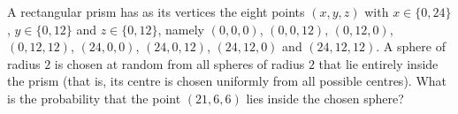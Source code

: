 A rectangular prism has as its vertices the eight points $(x,y,z)$ with $x\in\{0,24\}$, $y\in\{0,12\}$ and $z\in\{0,12\}$, namely $(0,0,0)$, $(0,0,12)$, $(0,12,0)$, $(0,12,12)$, $(24,0,0)$, $(24,0,12)$, $(24,12,0)$ and $(24,12,12)$. A sphere of radius $2$ is chosen at random from all spheres of radius $2$ that lie entirely inside the prism (that is, its centre is chosen uniformly from all possible centres). What is the probability that the point $(21,6,6)$ lies inside the chosen sphere?
